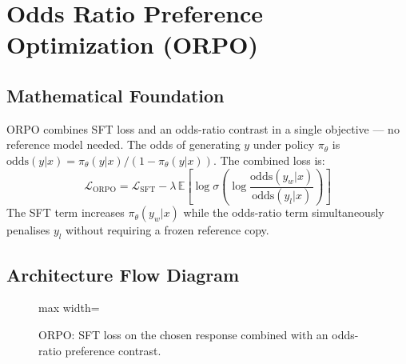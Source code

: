 \documentclass{article}
\begin{document}
\newpage
\section{Odds Ratio Preference Optimization (ORPO)}

\subsection{Mathematical Foundation}
ORPO combines SFT loss and an odds-ratio contrast in a single objective — no reference model needed. The odds of generating $y$ under policy $\pi_\theta$ is $\text{odds}(y|x) = \pi_\theta(y|x)/(1-\pi_\theta(y|x))$. The combined loss is:
\begin{equation}
  \mathcal{L}_{\text{ORPO}} = \mathcal{L}_{\text{SFT}} - \lambda\,\mathbb{E}\!\left[\log\sigma\!\left(\log\frac{\text{odds}(y_w|x)}{\text{odds}(y_l|x)}\right)\right]
\end{equation}
The SFT term increases $\pi_\theta(y_w|x)$ while the odds-ratio term simultaneously penalises $y_l$ without requiring a frozen reference copy.

\subsection{Architecture Flow Diagram}

\begin{figure}[h]
\centering
\begin{adjustbox}{max width=\linewidth}
\end{adjustbox}
\caption{ORPO: SFT loss on the chosen response combined with an odds-ratio preference contrast.}
\end{figure}
\end{document}
